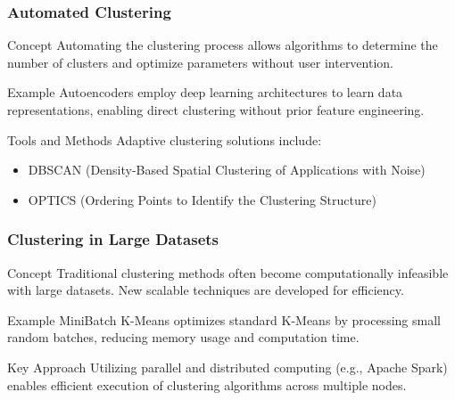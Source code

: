 \documentclass[aspectratio=169]{beamer}
\begin{document}
\begin{frame}[fragile]
    \frametitle{Automated Clustering}
    \begin{block}{Concept}
        Automating the clustering process allows algorithms to determine the number of clusters and optimize parameters without user intervention.
    \end{block}

    \begin{block}{Example}
        Autoencoders employ deep learning architectures to learn data representations, enabling direct clustering without prior feature engineering.
    \end{block}

    \begin{block}{Tools and Methods}
        Adaptive clustering solutions include:
        \begin{itemize}
            \item DBSCAN (Density-Based Spatial Clustering of Applications with Noise)
            \item OPTICS (Ordering Points to Identify the Clustering Structure)
        \end{itemize}
    \end{block}
\end{frame}

\begin{frame}[fragile]
    \frametitle{Clustering in Large Datasets}
    \begin{block}{Concept}
        Traditional clustering methods often become computationally infeasible with large datasets. New scalable techniques are developed for efficiency.
    \end{block}

    \begin{block}{Example}
        MiniBatch K-Means optimizes standard K-Means by processing small random batches, reducing memory usage and computation time.
    \end{block}

    \begin{block}{Key Approach}
        Utilizing parallel and distributed computing (e.g., Apache Spark) enables efficient execution of clustering algorithms across multiple nodes.
    \end{block}
\end{frame}
\end{document}
